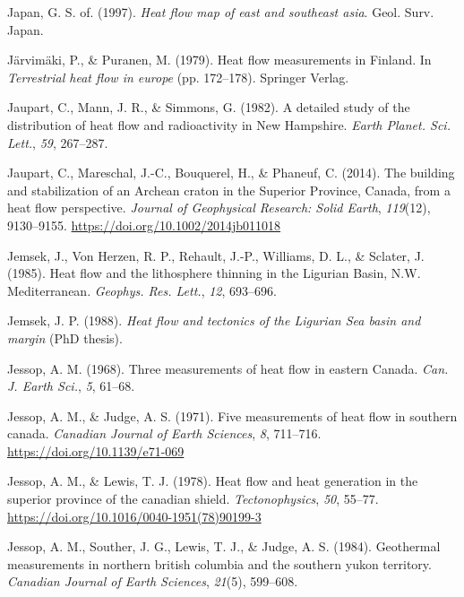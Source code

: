 \begin{CSLReferences}{1}{1}
\leavevmode{}%
Japan, G. S. of. (1997). \emph{Heat flow map of east and southeast asia}. Geol. Surv. Japan.

\leavevmode{}%
Järvimäki, P., \& Puranen, M. (1979). Heat flow measurements in {Finland}. In \emph{Terrestrial heat flow in europe} (pp. 172--178). Springer Verlag.

\leavevmode{}%
Jaupart, C., Mann, J. R., \& Simmons, G. (1982). A detailed study of the distribution of heat flow and radioactivity in {New Hampshire}. \emph{Earth Planet. Sci. Lett.}, \emph{59}, 267--287.

\leavevmode{}%
Jaupart, C., Mareschal, J.-C., Bouquerel, H., \& Phaneuf, C. (2014). The building and stabilization of an {Archean} craton in the {Superior Province, Canada}, from a heat flow perspective. \emph{Journal of Geophysical Research: Solid Earth}, \emph{119}(12), 9130--9155. \url{https://doi.org/10.1002/2014jb011018}

\leavevmode{}%
Jemsek, J., Von Herzen, R. P., Rehault, J.-P., Williams, D. L., \& Sclater, J. (1985). Heat flow and the lithosphere thinning in the {Ligurian Basin, N.W. Mediterranean}. \emph{Geophys. Res. Lett.}, \emph{12}, 693--696.

\leavevmode{}%
Jemsek, J. P. (1988). \emph{Heat flow and tectonics of the {Ligurian Sea} basin and margin} (PhD thesis).

\leavevmode{}%
Jessop, A. M. (1968). Three measurements of heat flow in eastern {Canada}. \emph{Can. J. Earth Sci.}, \emph{5}, 61--68.

\leavevmode{}%
Jessop, A. M., \& Judge, A. S. (1971). Five measurements of heat flow in southern canada. \emph{Canadian Journal of Earth Sciences}, \emph{8}, 711--716. \url{https://doi.org/10.1139/e71-069}

\leavevmode{}%
Jessop, A. M., \& Lewis, T. J. (1978). Heat flow and heat generation in the superior province of the canadian shield. \emph{Tectonophysics}, \emph{50}, 55--77. \url{https://doi.org/10.1016/0040-1951(78)90199-3}

\leavevmode{}%
Jessop, A. M., Souther, J. G., Lewis, T. J., \& Judge, A. S. (1984). Geothermal measurements in northern british columbia and the southern yukon territory. \emph{Canadian Journal of Earth Sciences}, \emph{21}(5), 599--608.


\end{CSLReferences}
